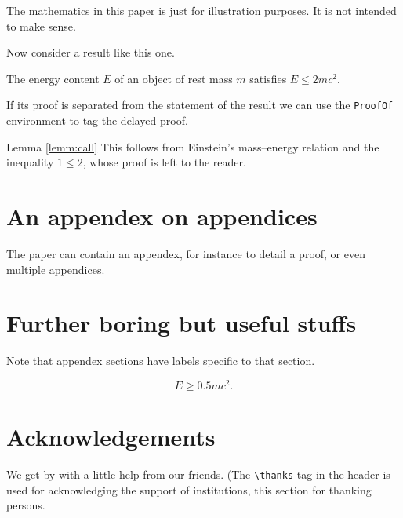 \documentclass[a4paper]
{cedram-smai-jcm}
\begin{document}
\begin{remark}
  The mathematics in this paper is just for illustration purposes.  It is not
  intended to make sense.
\end{remark}

Now consider a result like this one.

\begin{lemma}\label{lemm:call}
  The energy content $E$ of an object of rest mass $m$ satisfies $E\le 2 m c^2$.
\end{lemma}

\noindent
If its proof is separated from the statement of the result
we can use the \verb#ProofOf# environment to tag the
delayed proof.

\medskip

\begin{ProofOf}{Lemma \ref{lemm:call}}
  This follows from Einstein's mass--energy relation and the inequality $1\le 2$,
  whose proof is left to the reader.
\end{ProofOf}


\appendix

\section{An appendex on appendices}

The paper can contain an appendex, for instance to detail a proof, or even multiple appendices.

\section{Further boring but useful stuffs}
Note that appendex sections have labels specific to that section.

\begin{equation}
E\ge 0.5 m c^2.
\end{equation}


\section*{Acknowledgements}
We get by with a little help from  our friends.
(The \verb#\thanks# tag in the header is used for acknowledging the support of institutions,
this section for thanking persons.




\end{document}

